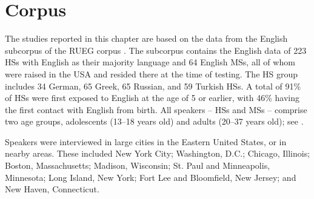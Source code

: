 \documentclass[output=paper,colorlinks,citecolor=brown]{langscibook}
\begin{document}
\section{Corpus} \label{sec:pashkovaetal:Corpus}
  The studies reported in this chapter are based on the data from the English subcorpus of the RUEG corpus \parencite{wiese2021}. The subcorpus contains the English data of 223 HSs with English as their majority language and 64 English MSs, all of whom were raised in the USA and resided there at the time of testing. The HS group includes 34 German, 65 Greek, 65 Russian, and 59 Turkish HSs. A total of 91\% of HSs were first exposed to English at the age of 5 or earlier, with 46\% having the first contact with English from birth. All speakers -- HSs and MSs -- comprise two age groups, adolescents (13--18 years old) and adults (20--37 years old); see .

Speakers were interviewed in large cities in the Eastern United States, or in nearby areas. These included New York City; Washington, D.C.; Chicago, Illinois; Boston, Massachusetts; Madison, Wisconsin; St. Paul and Minneapolis, Minnesota; Long Island, New York; Fort Lee and Bloomfield, New Jersey; and New Haven, Connecticut.

 
\begin{table}
\small
  \caption{Characteristics of speakers from the English subcorpus of the RUEG corpus}
    \label{tab:pashkovaetal:ages}
\end{table}
\end{document}
